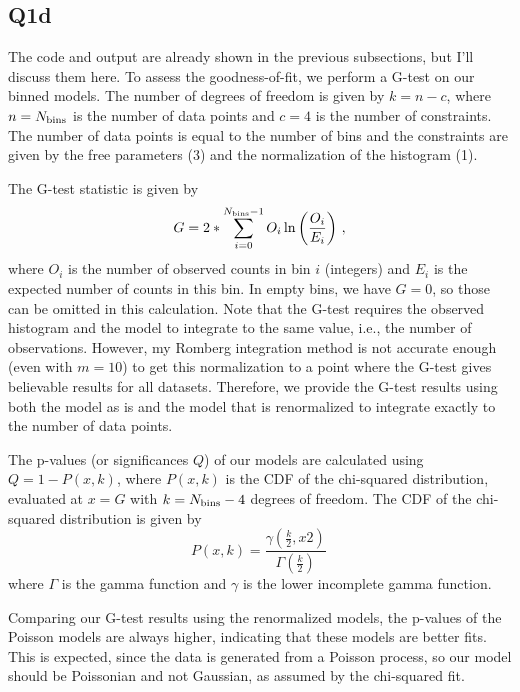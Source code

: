 \subsection{Q1d}

The code and output are already shown in the previous subsections, but I'll discuss them here.
To assess the goodness-of-fit, we perform a G-test on our binned models. The number of degrees of freedom is given by $k = n - c$, 
where $n = N_{\rm bins}$ is the number of data points and $c = 4$ is the number of constraints. The number of data points is equal
to the number of bins and the constraints are given by the free parameters (3) and the normalization of the histogram (1).

The G-test statistic is given by
\begin{equation}
    G = 2 * \sum_{i = 0}^{N_{\rm bins} - 1} O_{i} \ln\left( \frac{O_{i}}{E_{i}} \right) \, ,
\end{equation}
where $O_{i}$ is the number of observed counts in bin $i$ (integers) and $E_{i}$ is the expected number of counts in this bin. 
In empty bins, we have $G = 0$, so those can be omitted in this calculation. Note that the G-test requires the observed histogram
and the model to integrate to the same value, i.e., the number of observations. However, my Romberg integration method is not accurate
enough (even with $m = 10$) to get this normalization to a point where the G-test gives believable results for all datasets. Therefore,
we provide the G-test results using both the model as is and the model that is renormalized to integrate exactly to the number of data points.

The p-values (or significances $Q$) of our models are calculated using $Q = 1 - P(x, k)$, where $P(x, k)$ is the CDF of the chi-squared distribution,
evaluated at $x = G$ with $k = N_{\rm bins} - 4$ degrees of freedom. The CDF of the chi-squared distribution is given by
\begin{equation}
    P(x, k) = \frac{\gamma \left( \frac{k}{2}, {x}{2} \right)}{\Gamma \left( \frac{k}{2} \right)} \,
\end{equation}
where $\Gamma$ is the gamma function and $\gamma$ is the lower incomplete gamma function.

Comparing our G-test results using the renormalized models, the p-values of the Poisson models are always higher, indicating that these models are better fits. 
This is expected, since the data is generated from a Poisson process, so our model should be Poissonian and not Gaussian, as assumed by the chi-squared fit.
